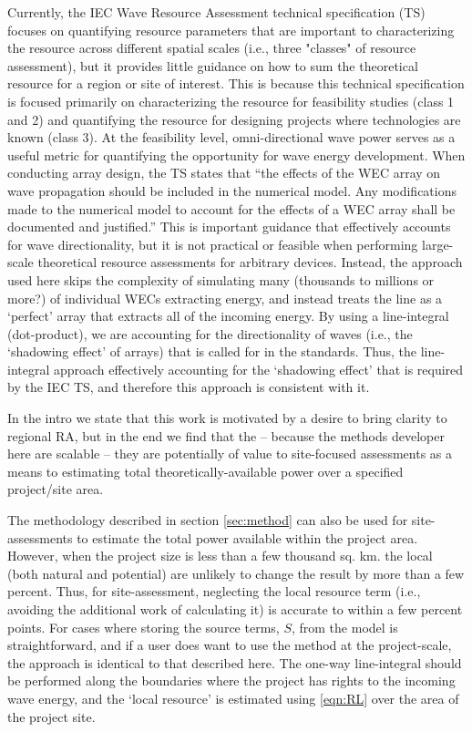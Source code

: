 Currently, the IEC Wave Resource Assessment technical specification (TS) focuses on quantifying resource parameters that are important to characterizing the resource across different spatial scales (i.e., three "classes" of resource assessment), but it provides little guidance on how to sum the theoretical resource for a region or site of interest. This is because this technical specification is focused primarily on characterizing the resource for feasibility studies (class 1 and 2) and quantifying the resource for designing projects where technologies are known (class 3). At the feasibility level, omni-directional wave power serves as a useful metric for quantifying the opportunity for wave energy development. When conducting array design, the TS states that ``the effects of the WEC array on wave propagation should be included in the numerical model. Any modifications made to the numerical model to account for the effects of a WEC array shall be documented and justified.'' This is important guidance that effectively accounts for wave directionality, but it is not practical or feasible when performing large-scale theoretical resource assessments for arbitrary devices. Instead, the approach used here skips the complexity of simulating many (thousands to millions or more?) of individual WECs extracting energy, and instead treats the line as a `perfect' array that extracts all of the incoming energy. By using a line-integral (dot-product), we are accounting for the directionality of waves (i.e., the `shadowing effect' of arrays) that is called for in the standards. Thus, the line-integral approach effectively accounting for the `shadowing effect' that is required by the IEC TS, and therefore this approach is consistent with it.


In the intro we state that this work is motivated by a desire to bring clarity to regional RA, but in the end we find that the -- because the methods developer here are scalable -- they are potentially of value to site-focused assessments as a means to estimating total theoretically-available power over a specified project/site area.

The methodology described in section \ref{sec:method} can also be used for site-assessments to estimate the total power available within the project area. However, when the project size is less than a few thousand sq. km. the local (both natural and potential) are unlikely to change the result by more than a few percent. Thus, for site-assessment, neglecting the local resource term (i.e., avoiding the additional work of calculating it) is accurate to within a few percent points.
For cases where storing the source terms, $S$, from the model is straightforward, and if a user does want to use the method at the project-scale, the approach is identical to that described here. The one-way line-integral should be performed along the boundaries where the project has rights to the incoming wave energy, and the `local resource' is estimated using \ref{eqn:RL} over the area of the project site. 

